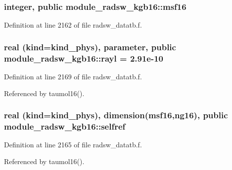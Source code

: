 \subsubsection[{\texorpdfstring{msf16}{msf16}}]{\setlength{\rightskip}{0pt plus 5cm}integer, public module\+\_\+radsw\+\_\+kgb16\+::msf16}\hypertarget{namespacemodule__radsw__kgb16_ab35df3f7d231e98fbef5738119138907}{}\label{namespacemodule__radsw__kgb16_ab35df3f7d231e98fbef5738119138907}


Definition at line 2162 of file radsw\+\_\+datatb.\+f.

\subsubsection[{\texorpdfstring{rayl}{rayl}}]{\setlength{\rightskip}{0pt plus 5cm}real (kind=kind\+\_\+phys), parameter, public module\+\_\+radsw\+\_\+kgb16\+::rayl = 2.\+91e-\/10}\hypertarget{namespacemodule__radsw__kgb16_a27964e0300eb686acf1ed3c8459d3810}{}\label{namespacemodule__radsw__kgb16_a27964e0300eb686acf1ed3c8459d3810}


Definition at line 2169 of file radsw\+\_\+datatb.\+f.



Referenced by taumol16().

\subsubsection[{\texorpdfstring{selfref}{selfref}}]{\setlength{\rightskip}{0pt plus 5cm}real (kind=kind\+\_\+phys), dimension({\bf msf16},ng16), public module\+\_\+radsw\+\_\+kgb16\+::selfref}\hypertarget{namespacemodule__radsw__kgb16_a77d98f3fb766d4abfd494332ce67c2c2}{}\label{namespacemodule__radsw__kgb16_a77d98f3fb766d4abfd494332ce67c2c2}


Definition at line 2165 of file radsw\+\_\+datatb.\+f.



Referenced by taumol16().

